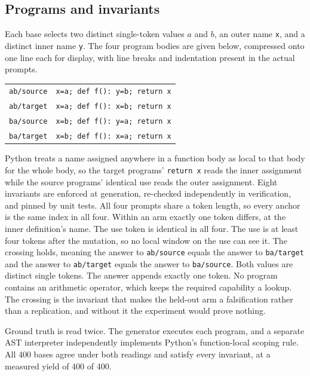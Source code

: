 \documentclass{article}
\begin{document}
\subsection{Programs and invariants}

Each base selects two distinct single-token values $a$ and $b$, an outer name \texttt{x}, and a distinct inner name \texttt{y}. The four program bodies are given below, compressed onto one line each for display, with line breaks and indentation present in the actual prompts.

\begin{center}
\small
\begin{tabular}{ll}
\toprule
\texttt{ab/source} & \texttt{x=a; def f(): y=b; return x} \\
\texttt{ab/target} & \texttt{x=a; def f(): x=b; return x} \\
\texttt{ba/source} & \texttt{x=b; def f(): y=a; return x} \\
\texttt{ba/target} & \texttt{x=b; def f(): x=a; return x} \\
\bottomrule
\end{tabular}
\end{center}

Python treats a name assigned anywhere in a function body as local to that body for the whole body, so the target programs' \texttt{return x} reads the inner assignment while the source programs' identical use reads the outer assignment. Eight invariants are enforced at generation, re-checked independently in verification, and pinned by unit tests. All four prompts share a token length, so every anchor is the same index in all four. Within an arm exactly one token differs, at the inner definition's name. The use token is identical in all four. The use is at least four tokens after the mutation, so no local window on the use can see it. The crossing holds, meaning the answer to \texttt{ab/source} equals the answer to \texttt{ba/target} and the answer to \texttt{ab/target} equals the answer to \texttt{ba/source}. Both values are distinct single tokens. The answer appends exactly one token. No program contains an arithmetic operator, which keeps the required capability a lookup. The crossing is the invariant that makes the held-out arm a falsification rather than a replication, and without it the experiment would prove nothing.

Ground truth is read twice. The generator executes each program, and a separate AST interpreter independently implements Python's function-local scoping rule. All 400 bases agree under both readings and satisfy every invariant, at a measured yield of 400 of 400.
\end{document}
